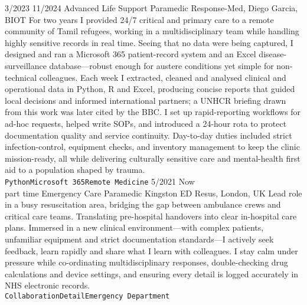 \documentclass[9pt]{developercv} %
\begin{document}
\begin{minipage}[t]{0.61\textwidth}
	\vspace{-\baselineskip}
	

	\begin{entrylist}
		\entry
			{3/2023 11/2024}
			{Advanced Life Support Paramedic}
			{Response-Med, Diego Garcia, BIOT}
			{For two years I provided 24/7 critical and primary care to a remote community of Tamil refugees, working in a multidisciplinary team while handling highly sensitive records in real time. Seeing that no data were being captured, I designed and ran a Microsoft 365 patient-record system and an Excel disease-surveillance database—robust enough for austere conditions yet simple for non-technical colleagues. Each week I extracted, cleaned and analysed clinical and operational data in Python, R and Excel, producing concise reports that guided local decisions and informed international partners; a UNHCR briefing drawn from this work was later cited by the BBC. I set up rapid-reporting workflows for ad-hoc requests, helped write SOPs, and introduced a 24-hour rota to protect documentation quality and service continuity. Day-to-day duties included strict infection-control, equipment checks, and inventory management to keep the clinic mission-ready, all while delivering culturally sensitive care and mental-health first aid to a population shaped by trauma.\\ \texttt{Python}\slashsep\texttt{Microsoft 365}\slashsep\texttt{Remote Medicine}}
		\entry
			{5/2021 Now\\\footnotesize{part time}}
			{Emergency Care Paramedic}
			{Kingston ED Resus, London, UK}
			{Lead role in a busy resuscitation area, bridging the gap between ambulance crews and critical care teams. Translating pre-hospital handovers into clear in-hospital care plans. Immersed in a new clinical environment—with complex patients, unfamiliar equipment and strict documentation standards—I actively seek feedback, learn rapidly and share what I learn with colleagues. I stay calm under pressure while co-ordinating multidisciplinary responses, double-checking drug calculations and device settings, and ensuring every detail is logged accurately in NHS electronic records.\\ 
			\texttt{Collaboration}\slashsep\texttt{Detail}\slashsep\texttt{Emergency Department}}

\end{entrylist}
\end{minipage}
\end{document}
